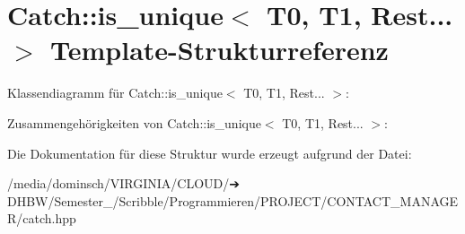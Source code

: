 \hypertarget{structCatch_1_1is__unique_3_01T0_00_01T1_00_01Rest_8_8_8_01_4}{}\section{Catch\+:\+:is\+\_\+unique$<$ T0, T1, Rest... $>$ Template-\/\+Strukturreferenz}
\label{structCatch_1_1is__unique_3_01T0_00_01T1_00_01Rest_8_8_8_01_4}


Klassendiagramm für Catch\+:\+:is\+\_\+unique$<$ T0, T1, Rest... $>$\+:


Zusammengehörigkeiten von Catch\+:\+:is\+\_\+unique$<$ T0, T1, Rest... $>$\+:


Die Dokumentation für diese Struktur wurde erzeugt aufgrund der Datei\+:\begin{DoxyCompactItemize}
\item 
/media/dominsch/\+V\+I\+R\+G\+I\+N\+I\+A/\+C\+L\+O\+U\+D/➔ D\+H\+B\+W/\+Semester\+\_/\+Scribble/\+Programmieren/\+P\+R\+O\+J\+E\+C\+T/\+C\+O\+N\+T\+A\+C\+T\+\_\+\+M\+A\+N\+A\+G\+E\+R/catch.\+hpp\end{DoxyCompactItemize}

